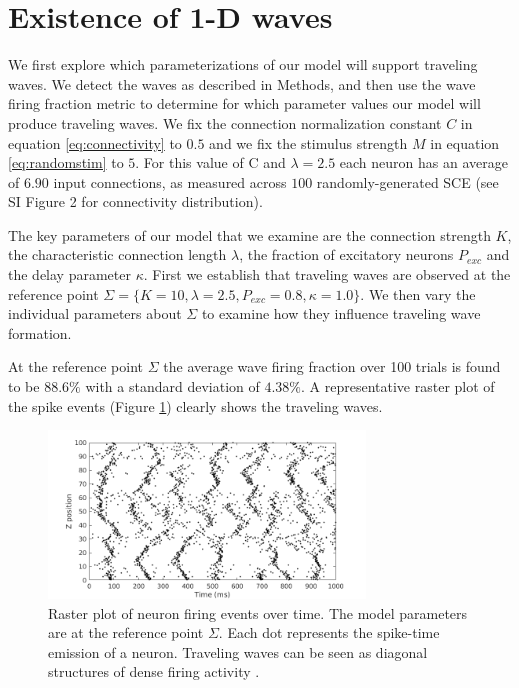 \FloatBarrier

\section{Existence of 1-D waves} \label{sub:waves}
We first explore which parameterizations of our model will support traveling waves.
We detect the waves as described in Methods, and then use the wave firing fraction metric to determine for which parameter values our model will produce traveling waves.
We fix the connection normalization constant $C$ in equation \ref{eq:connectivity} to $0.5$ and we fix the stimulus strength $M$ in equation \ref{eq:randomstim} to $5$.
For this value of C and $\lambda=2.5$ each neuron has an average of $6.90$ input connections, as measured across $100$ randomly-generated SCE (see SI Figure 2 for connectivity distribution).

The key parameters of our model that we examine are the connection strength $K$, the characteristic connection length $\lambda$, the fraction of excitatory neurons $P_{exc}$ and the delay parameter $\kappa$.
First we establish that traveling waves are observed at the reference  point $\Sigma = \{K=10,\lambda=2.5,P_{exc}=0.8,\kappa=1.0 \}$.
We then vary the individual parameters about $\Sigma$ to examine how they influence traveling wave formation.

At the reference  point $\Sigma$ the average wave firing fraction over 100 trials is found to be $88.6\%$ with a standard deviation of $4.38\%$.
A representative raster plot of the spike events (Figure \ref{fig:sigma_raster}) clearly shows the traveling waves.
\begin{figure}[!htb]
  \centering
  \includegraphics[width=0.75\textwidth]{fig/baseline}
  \caption{Raster plot of neuron firing events over time. The model parameters are at the reference  point $\Sigma$. 
	Each dot represents the spike-time emission of a neuron. 
	Traveling waves can be seen as diagonal structures of dense firing activity \citet{Senk2020}. }
  \label{fig:sigma_raster}
\end{figure}

